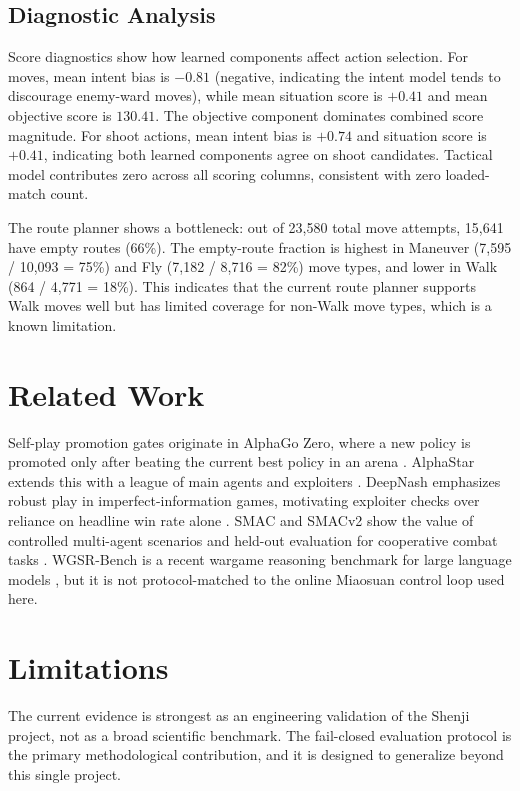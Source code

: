 \documentclass{article}
\begin{document}
\subsection{Diagnostic Analysis}

Score diagnostics show how learned components affect action selection. For moves, mean intent bias is $-0.81$ (negative, indicating the intent model tends to discourage enemy-ward moves), while mean situation score is $+0.41$ and mean objective score is $130.41$. The objective component dominates combined score magnitude. For shoot actions, mean intent bias is $+0.74$ and situation score is $+0.41$, indicating both learned components agree on shoot candidates. Tactical model contributes zero across all scoring columns, consistent with zero loaded-match count.

The route planner shows a bottleneck: out of 23,580 total move attempts, 15,641 have empty routes (66\%). The empty-route fraction is highest in Maneuver (7,595 / 10,093 = 75\%) and Fly (7,182 / 8,716 = 82\%) move types, and lower in Walk (864 / 4,771 = 18\%). This indicates that the current route planner supports Walk moves well but has limited coverage for non-Walk move types, which is a known limitation.

\section{Related Work}

Self-play promotion gates originate in AlphaGo Zero, where a new policy is promoted only after beating the current best policy in an arena \citep{silver2017alphagozero}. AlphaStar extends this with a league of main agents and exploiters \citep{vinyals2019alphastar}. DeepNash emphasizes robust play in imperfect-information games, motivating exploiter checks over reliance on headline win rate alone \citep{perolat2022deepnash}. SMAC and SMACv2 show the value of controlled multi-agent scenarios and held-out evaluation for cooperative combat tasks \citep{samvelyan2019smac,ellis2023smacv2}. WGSR-Bench is a recent wargame reasoning benchmark for large language models \citep{yin2025wgsrbench}, but it is not protocol-matched to the online Miaosuan control loop used here.

\section{Limitations}

The current evidence is strongest as an engineering validation of the Shenji project, not as a broad scientific benchmark. The fail-closed evaluation protocol is the primary methodological contribution, and it is designed to generalize beyond this single project.
\end{document}
